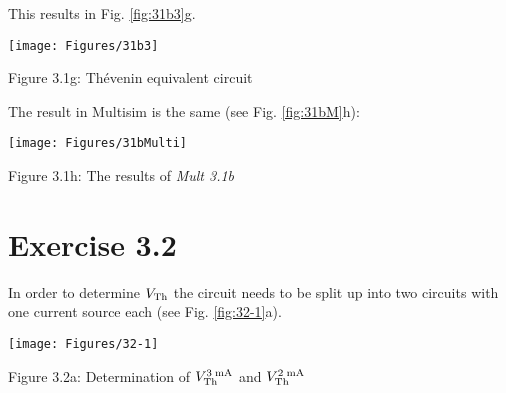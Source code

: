 \newpage
\noindent This results in Fig. \ref{fig:31b3}g.
\begin{center}
    \texttt{[image: Figures/31b3]}	
 
    Figure 3.1g: Th\'{e}venin equivalent circuit	  
    \label{fig:31b3} 
\end{center}

\noindent The result in Multisim is the same (see Fig. \ref{fig:31bM}h):
\begin{center}
    \texttt{[image: Figures/31bMulti]}	
 
    Figure 3.1h: The results of \textit{Mult 3.1b}	  
    \label{fig:31bM} 
\end{center}

\newpage
\section{\textbf{Exercise 3.2}}
In order to determine $V_{\rm Th}$ the circuit needs to be split up into two circuits with one current source each (see Fig. \ref{fig:32-1}a). 
\begin{center}
    \texttt{[image: Figures/32-1]}
 
    Figure 3.2a: Determination of $V_{\rm Th}^{\rm 3 \; mA}$ and $V_{\rm Th}^{\rm 2 \; mA}$	  
    \label{fig:32-1} 
\end{center}

